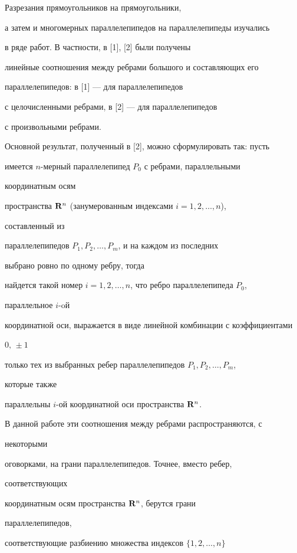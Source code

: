 Разрезания прямоугольников на прямоугольники,  


а затем и многомерных параллелепипедов на параллелепипеды изучались  


в ряде работ. В частности, в [1], [2] были получены  


линейные соотношения между ребрами большого и составляющих его  


параллелепипедов: в [1] --- для параллелепипедов  


с целочисленными ребрами, в [2] --- для параллелепипедов  


с произвольными ребрами.  


 


Основной результат, полученный в [2], можно сформулировать так: пусть  


имеется $n$-мерный параллелепипед $P_0$ с ребрами, параллельными 


координатным осям  


пространства $\bold R^n$ (занумерованным индексами $i=1,2,\dotsc,n$), 


составленный из  


параллелепипедов $P_1,P_2,\dotsc,P_m$, и на каждом из последних  


выбрано ровно по одному ребру, тогда  


найдется такой номер $i=1,2,\dotsc,n$, что ребро параллелепипеда $P_0$, 


параллельное $i$-oй 


координатной оси, выражается в виде линейной комбинации с коэффициентами 


$0,\,\pm1$ 


только тех из выбранных ребер параллелепипедов $P_1,P_2,\dotsc,P_m$, 


которые также  


параллельны $i$-ой координатной оси пространства $\bold R^n$. 


 


В данной работе эти соотношения между ребрами распространяются, с 


некоторыми  


оговорками, на грани параллелепипедов. Точнее, вместо ребер, 


соответствующих  


координатным осям пространства $\bold R^n$, берутся грани 


параллелепипедов,  


соответствующие разбиению множества индексов $\{1,2,\dotsc,n\}$ 


